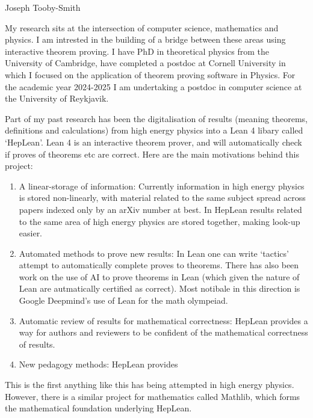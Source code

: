 \documentclass[12pt,letter]{article}
\newcounter{customtitle}
\begin{document}
\vspace{-1cm}
\begin{flushright}
{{\Large \color{white}Joseph Tooby-Smith }}
\end{flushright}
\vspace{0.4cm}

My research sits at the intersection of computer science, 
mathematics and physics.
I am intrested in the building of a bridge between these areas using 
interactive theorem proving. I have PhD in theoretical physics 
from the University of Cambridge, 
have completed a postdoc at Cornell University in which I focused on the 
application of theorem proving software in Physics. For the academic 
year 2024-2025 I am undertaking a postdoc in computer science at the 
University of Reykjavik.

Part of my past research has been the digitalisation of results (meaning theorems, definitions and calculations) from high energy physics into a Lean 4 libary called `HepLean'. Lean 4 is an interactive theorem prover, and will automatically check if proves of theorems etc are correct. Here are the main motivations behind this project:
\begin{enumerate}
\item A linear-storage of information: Currently information in high energy physics is stored non-linearly, with material related to the same subject spread across papers indexed only by an arXiv number at best. In HepLean results related to the same area of high energy physics are stored together, making look-up easier.
\item Automated methods to prove new results: In Lean one can write `tactics' attempt to automatically complete proves to theorems. There has also been work on the use of AI to prove theorems in Lean (which given the nature of Lean are autmatically certified as correct). Most notibale in this direction is Google Deepmind's use of Lean for the math olympeiad. 
\item Automatic review of results for mathematical correctness: HepLean provides a way for authors and reviewers to be confident of the mathematical correctness of results.
\item New pedagogy methods:	HepLean provides 
\end{enumerate}
 This is the first anything like this has being attempted
in high energy physics. However, there is a similar project for mathematics called Mathlib, which forms the mathematical foundation underlying HepLean.
\end{document}
